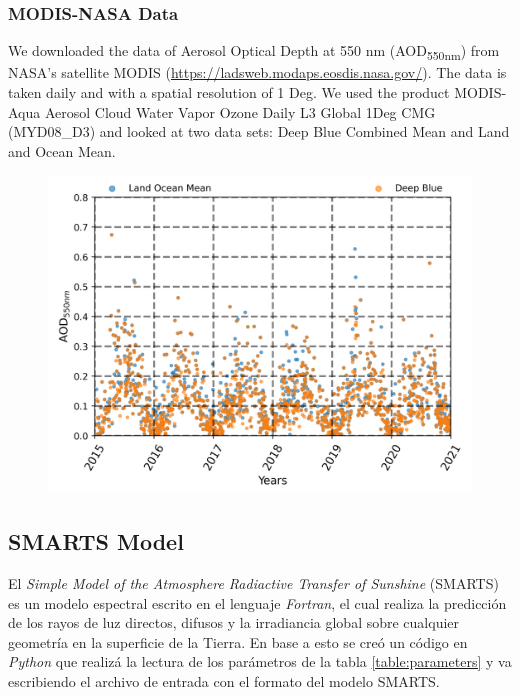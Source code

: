 \subsubsection{MODIS-NASA Data}
We downloaded the data of Aerosol Optical Depth at 550 nm (AOD\textsubscript{550nm}) from NASA’s
satellite MODIS (\url{https://ladsweb.modaps.eosdis.nasa.gov/}). The data is taken daily and with a spatial
resolution of 1 Deg. We used the product MODIS-Aqua Aerosol Cloud Water Vapor Ozone Daily L3 Global 1Deg CMG
(MYD08\_D3) and looked at two data sets: Deep Blue Combined Mean and Land and Ocean Mean. 
\begin{figure}[H]
    \centering
    \includegraphics[scale=0.5]{images/AOD_Daily_MODIS.png}
    \caption{}
\end{figure}
\subsection{SMARTS Model}
El \textit{Simple Model of the Atmosphere Radiactive Transfer of Sunshine} (SMARTS) es un modelo espectral
escrito en el lenguaje \textit{Fortran}, el cual realiza la predicción de los rayos de luz directos, difusos y la 
irradiancia global sobre cualquier geometría en la superficie de la Tierra. En base a esto se creó un código en
\textit{Python} que  realizá la lectura de los parámetros de la tabla \ref{table:parameters} y va escribiendo el archivo de entrada 
con el formato del modelo SMARTS. 

